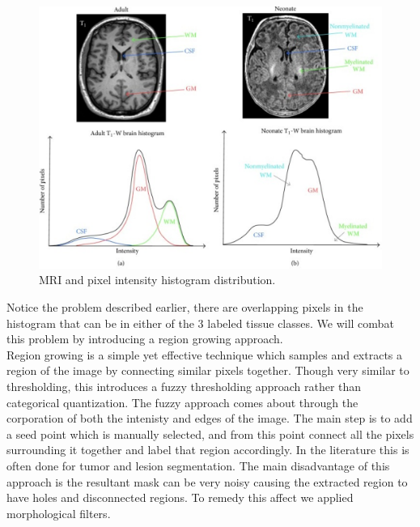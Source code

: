 \begin{figure}[H]
  \centering
  \includegraphics[width=\linewidth]{img/mriHistogram.png}
  \caption{MRI and pixel intensity histogram distribution.}
  \label{fig:mriHistogram}
\end{figure}

Notice the problem described earlier, there are overlapping pixels in the histogram that can be in either of the 3 labeled tissue classes.  We will combat this problem by introducing a region growing approach.\\

Region growing is a simple yet effective technique which samples and extracts a region of the image by connecting similar pixels together. Though very similar to thresholding, this introduces a fuzzy thresholding approach rather than categorical quantization.  The fuzzy approach comes about through the corporation of both the intenisty and edges of the image. The main step is to add a seed point which is manually selected, and from this point connect all the pixels surrounding it together and label that region accordingly.  In the literature this is often done for tumor and lesion segmentation\cite{guliato1998segmentation}. The main disadvantage of this approach is the resultant mask can be very noisy causing the extracted region to have holes and disconnected regions.  To remedy this affect we applied morphological filters\cite{mendiola2007morphological}. 